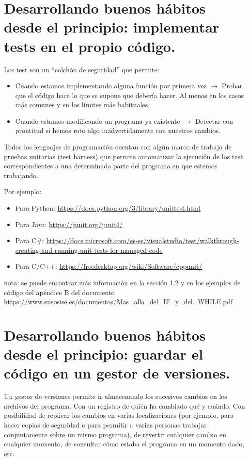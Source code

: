 \documentclass[spanish,12pt,a4paper,final,oneside]{book}
\begin{document}
\chapter{Desarrollando buenos hábitos desde el principio: implementar tests en el propio código.}

Los test son un ``colchón de seguridad'' que permite:
\begin{itemize}
\item Cuando estamos implementando alguna función por primera vez $\rightarrow$  Probar que el código hace lo que se supone que debería hacer. Al menos en los casos más comunes y en los límites más habituales.
\item Cuando estamos modificando un programa ya existente $\rightarrow$  Detectar con prontitud si hemos roto algo inadvertidamente con nuestros cambios.
\end{itemize}

Todos los lenguajes de programación cuentan con algún marco de trabajo de pruebas unitarias (test harness) que permite automatizar la ejecución de los test correspondientes a una determinada parte del programa en que estemos trabajando.

Por ejemplo:
\begin{itemize}
\item Para Python: \url{https://docs.python.org/3/library/unittest.html}
\item Para Java: \url{https://junit.org/junit4/}
\item Para C\#: \url{https://docs.microsoft.com/es-es/visualstudio/test/walkthrough-creating-and-running-unit-tests-for-managed-code}
\item Para C/C++: \url{https://freedesktop.org/wiki/Software/cppunit/}
\end{itemize}

\vspace{1cm}
nota: se puede encontrar más información en la sección 1.2 y en los ejemplos de código del apéndice B del documento \url{https://www.susosise.es/documentos/Mas_alla_del_IF_y_del_WHILE.pdf}



\chapter{Desarrollando buenos hábitos desde el principio: guardar el código en un gestor de versiones.}

Un gestor de versiones permite ir almacenando los sucesivos cambios en los archivos del programa. Con un registro de quién ha cambiado qué y cuándo. Con posibilidad de replicar los cambios en varias localizaciones (por ejemplo, para hacer copias de seguridad o para permitir a varias personas trabajar conjuntamente sobre un mismo programa), de revertir cualquier cambio en cualquier momento, de consultar cómo estaba el programa en un momento dado, etc.
\end{document}

